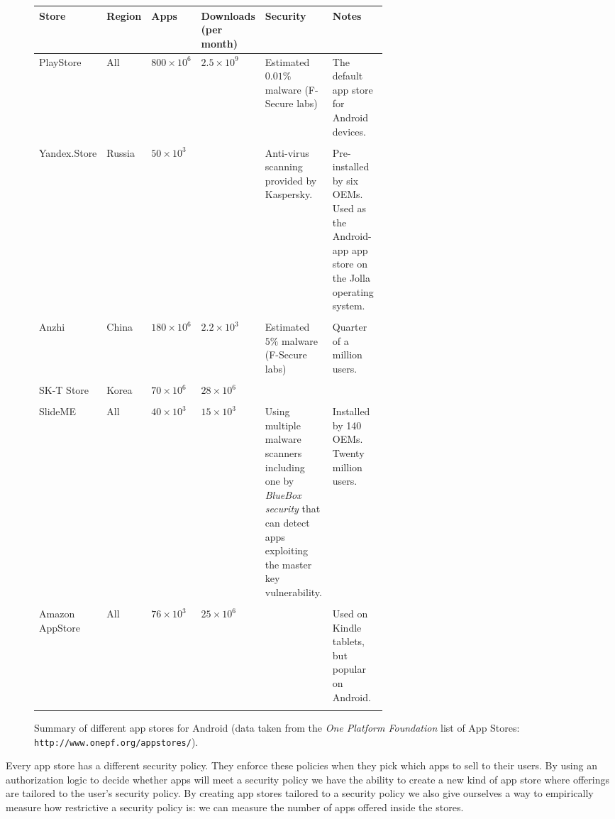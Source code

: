 \documentclass[a4paper,sfsidenotes]{%
  scrartcl%
}
\begin{document}
\begin{figure}\centering\smaller%
  \begin{tabular}{p{0.1\linewidth} l l p{0.13\linewidth} p{0.20\linewidth} p{0.20\linewidth}}
    \toprule
    Store & Region & Apps & Downloads (per month) & Security & Notes \\
    \midrule
    PlayStore & All & $800\times10^6$ & $2.5\times10^9$ & Estimated $0.01\%$ malware (F-Secure labs) & The default app store for Android devices.\\
    \addlinespace \\
    Yandex.Store & Russia & $50\times10^3$ & & Anti-virus scanning provided by Kaspersky. & Pre-installed by six OEMs. Used as the Android-app app store on the Jolla operating system. \\
    \addlinespace \\
    Anzhi & China & $180\times10^6$ & $2.2\times10^3$ & Estimated $5\%$ malware (F-Secure labs) & Quarter of a million users.\\
    \addlinespace \\
    SK-T Store & Korea & $70\times10^6$ & $28\times10^6$ & & \\
    \addlinespace \\
    SlideME & All & $40\times10^3$ & $15\times10^3$ & Using multiple malware scanners including one by \emph{BlueBox security} that can detect apps exploiting the master key vulnerability. & Installed by 140 OEMs. Twenty million users. \\
    \addlinespace \\
    Amazon AppStore & All & $76\times10^3$ & $25\times10^6$ & & Used on
    Kindle tablets, but popular on Android. \\
    \bottomrule
    \\
  \end{tabular}
  \caption[ Summary of different app stores. ]{Summary of different app stores for
    Android (data taken from the \emph{One Platform Foundation} list of App Stores:
    \texttt{http://www.onepf.org/appstores/}).}
    \label{tab:stores}
  \end{figure}

Every app store has a different security policy.  They enforce these
policies when they pick which apps to sell to their users.  By using an
authorization logic to decide whether apps will meet a security policy we have
the ability to create a new kind of app store where offerings are tailored to
the user's security policy.  By creating app stores tailored to a security
policy we also give ourselves a way to empirically measure how restrictive a
security policy is: we can measure the number of apps offered inside the stores.
\end{document}
